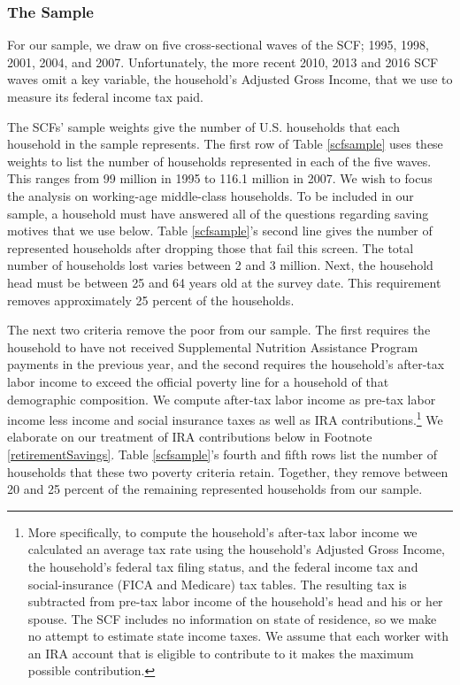 \documentclass[fleqccn,12pt]{article}
\begin{document}
\subsubsection{The Sample}

For our sample, we draw on five cross-sectional waves of the SCF; 1995, 1998, 2001, 2004, and 2007. Unfortunately, the more recent 2010, 2013 and 2016 SCF waves omit a key variable, the household's Adjusted Gross Income, that we use to measure its federal income tax paid. 

The SCFs' sample weights give the number of U.S. households that each household in the sample represents. The first row of Table \ref{scfsample} uses these weights to list the number of households represented in each of the five waves. This ranges from 99 million in 1995 to 116.1 million in 2007.  We wish to focus the analysis on working-age middle-class households. To be included in our sample, a household must have answered all of the questions regarding saving motives that we use below. Table \ref{scfsample}'s second line gives the number of represented households after dropping those that fail this screen. The total number of households lost varies between 2 and 3 million. Next, the household head must be between 25 and 64 years old at the survey date. This requirement removes approximately 25 percent of the households. 

The next two criteria remove the poor from our sample. The first requires the household to have not received Supplemental Nutrition Assistance Program payments in the previous year, and the second requires the household's after-tax labor income to exceed the official poverty line for a household of that demographic composition.  We compute after-tax labor income as pre-tax labor income less income and social insurance taxes as well as IRA contributions.\footnote{More specifically, to compute the household's after-tax labor income we calculated an average tax rate using the household's Adjusted Gross Income, the household's federal tax filing status, and the federal income tax and social-insurance (FICA and Medicare) tax tables. The resulting tax is subtracted from pre-tax labor income of the household's head and his or her spouse. The SCF includes no information on state of residence, so we make no attempt to estimate state income taxes. We assume that each worker with an IRA account that is eligible to contribute to it makes the maximum possible contribution.}   We elaborate on our treatment of IRA contributions below in Footnote \ref{retirementSavings}.  Table \ref{scfsample}'s fourth and fifth rows list the number of households that these two poverty criteria retain. Together, they remove between 20 and 25 percent of the remaining represented households from our sample.
\end{document}

